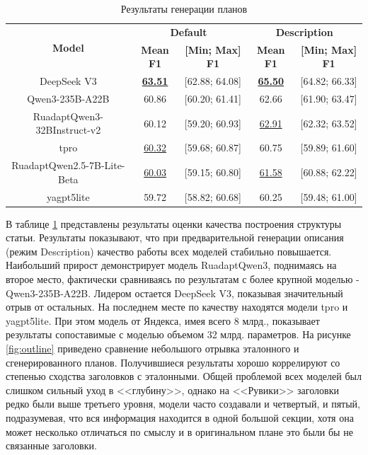 \documentclass{article}
\begin{document}
\begin{table}[ht!]
\centering
\caption{Результаты генерации планов}
\begin{tabular}{c|cc|cc}
\hline
\multirow{2}{*}{\textbf{Model}} & \multicolumn{2}{c|}{\textbf{Default}} & \multicolumn{2}{c}{\textbf{Description}} \\
 & \textbf{Mean F1} & \textbf{[Min; Max] F1} & \textbf{Mean F1} & \textbf{[Min; Max] F1} \\
\hline
DeepSeek V3                                         & \uline{\textbf{63.51}} & [62.88; 64.08] & \uline{\textbf{65.50}} & [64.82; 66.33] \\
Qwen3-235B-A22B                                     & 60.86 & [60.20; 61.41] & 62.66 & [61.90; 63.47] \\
\hline
RuadaptQwen3-\allowbreak 32BInstruct-v2             & 60.12 & [59.20; 60.93] & \uline{62.91} & [62.32; 63.52] \\
tpro                                                & \uline{60.32} & [59.68; 60.87] & 60.75 & [59.89; 61.60] \\
\hline
RuadaptQwen2.5-7B-\allowbreak Lite-\allowbreak Beta & \uline{60.03} & [59.15; 60.80] & \uline{61.58} & [60.88; 62.22] \\
yagpt5lite                                          & 59.72 & [58.82; 60.68] & 60.25 & [59.48; 61.00] \\
\hline
\end{tabular}
\label{tab:outline_res}
\end{table}

В таблице \ref{tab:outline_res} представлены результаты оценки качества построения структуры статьи. Результаты показывают, что при предварительной генерации описания (режим Description) 
качество работы всех моделей стабильно повышается. 
Наибольший прирост демонстрирует модель RuadaptQwen3, поднимаясь на второе место, фактически сравниваясь по результатам с более крупной моделью
- Qwen3-\allowbreak 235B-\allowbreak A22B. Лидером остается DeepSeek V3, показывая значительный отрыв от остальных. На последнем месте по качеству находятся модели tpro и yagpt5lite.
При этом модель от Яндекса, имея всего 8 млрд., показывает результаты сопоставимые с моделью объемом 32 млрд. параметров.
На рисунке \ref{fig:outline} приведено сравнение небольшого отрывка эталонного и сгенерированного планов.
Получившиеся результаты хорошо коррелируют со степенью сходства заголовков с эталонными. Общей проблемой всех моделей был слишком сильный уход в <<глубину>>, однако
на <<Рувики>> заголовки редко были выше третьего уровня, модели часто создавали и четвертый, и пятый, подразумевая, что вся информация находится в одной большой секции, хотя
она может несколько отличаться по смыслу и в оригинальном плане это были бы не связанные заголовки.
\end{document}
